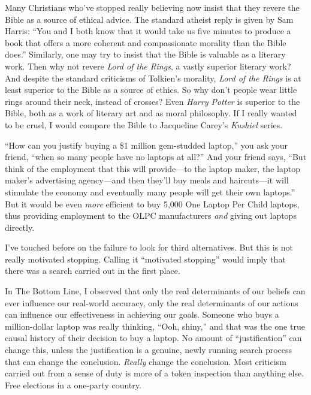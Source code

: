 \myendsectiontext


{
 Many Christians who've stopped really believing
now insist that they revere the Bible as a source of ethical advice.
The standard atheist reply is given by Sam Harris:
``You and I both know that it would take us five
minutes to produce a book that offers a more coherent and compassionate
morality than the Bible does.'' Similarly, one may
try to insist that the Bible is valuable as a literary work. Then why
not revere \textit{Lord of the Rings}, a vastly superior literary work?
And despite the standard criticisms of Tolkien's
morality, \textit{Lord of the Rings} is at least superior to the Bible
as a source of ethics. So why don't people wear little
rings around their neck, instead of crosses? Even \textit{Harry Potter}
is superior to the Bible, both as a work of literary art and as moral
philosophy. If I really wanted to be cruel, I would compare the Bible
to Jacqueline Carey's \textit{Kushiel} series. }

{
 ``How can you justify buying a \$1 million
gem-studded laptop,'' you ask your friend,
``when so many people have no laptops at
all?'' And your friend says, ``But
think of the employment that this will provide---to the laptop maker,
the laptop maker's advertising agency---and then
they'll buy meals and haircuts---it will stimulate the
economy and eventually many people will get their own
laptops.'' But it would be even \textit{more}
efficient to buy 5,000 One Laptop Per Child laptops, thus providing
employment to the OLPC manufacturers \textit{and} giving out laptops
directly.}

{
 I've touched before on the failure to look for
third alternatives. But this is not really motivated stopping. Calling
it ``motivated stopping'' would
imply that there was a search carried out in the first place.}

{
 In The Bottom Line, I observed that only the real determinants of
our beliefs can ever influence our real-world accuracy, only the real
determinants of our actions can influence our effectiveness in
achieving our goals. Someone who buys a million-dollar laptop was
really thinking, ``Ooh, shiny,'' and
that was the one true causal history of their decision to buy a laptop.
No amount of ``justification'' can
change this, unless the justification is a genuine, newly running
search process that can change the conclusion. \textit{Really} change
the conclusion. Most criticism carried out from a sense of duty is more
of a token inspection than anything else. Free elections in a one-party
country.}

